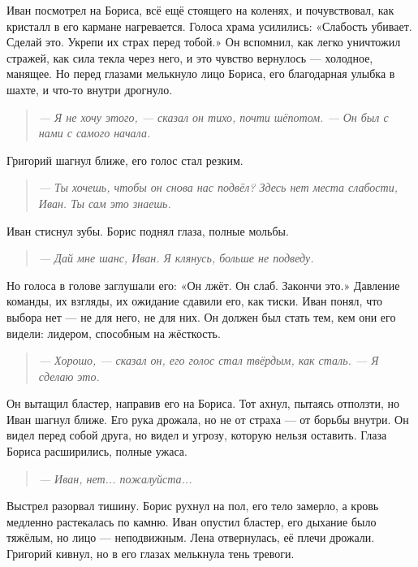 \documentclass[12pt,a4paper]{book}
\newenvironment{dialogue}{\begin{quote}\itshape}{\end{quote}} %
\begin{document}
Иван посмотрел на Бориса, всё ещё стоящего на коленях, и почувствовал, как кристалл в его кармане нагревается. Голоса храма усилились: «Слабость убивает. Сделай это. Укрепи их страх перед тобой.» Он вспомнил, как легко уничтожил стражей, как сила текла через него, и это чувство вернулось --- холодное, манящее. Но перед глазами мелькнуло лицо Бориса, его благодарная улыбка в шахте, и что-то внутри дрогнуло.

\begin{dialogue}
--- Я не хочу этого, --- сказал он тихо, почти шёпотом. --- Он был с нами с самого начала.
\end{dialogue}

Григорий шагнул ближе, его голос стал резким.

\begin{dialogue}
--- Ты хочешь, чтобы он снова нас подвёл? Здесь нет места слабости, Иван. Ты сам это знаешь.
\end{dialogue}

Иван стиснул зубы. Борис поднял глаза, полные мольбы.

\begin{dialogue}
--- Дай мне шанс, Иван. Я клянусь, больше не подведу.
\end{dialogue}

Но голоса в голове заглушали его: «Он лжёт. Он слаб. Закончи это.» Давление команды, их взгляды, их ожидание сдавили его, как тиски. Иван понял, что выбора нет --- не для него, не для них. Он должен был стать тем, кем они его видели: лидером, способным на жёсткость.

\begin{dialogue}
--- Хорошо, --- сказал он, его голос стал твёрдым, как сталь. --- Я сделаю это.
\end{dialogue}

Он вытащил бластер, направив его на Бориса. Тот ахнул, пытаясь отползти, но Иван шагнул ближе. Его рука дрожала, но не от страха --- от борьбы внутри. Он видел перед собой друга, но видел и угрозу, которую нельзя оставить. Глаза Бориса расширились, полные ужаса.

\begin{dialogue}
--- Иван, нет... пожалуйста...
\end{dialogue}

Выстрел разорвал тишину. Борис рухнул на пол, его тело замерло, а кровь медленно растекалась по камню. Иван опустил бластер, его дыхание было тяжёлым, но лицо --- неподвижным. Лена отвернулась, её плечи дрожали. Григорий кивнул, но в его глазах мелькнула тень тревоги.
\end{document}

